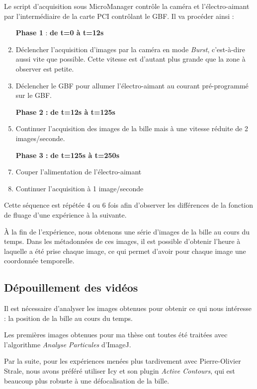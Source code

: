 	Le script d'acquisition sous MicroManager contrôle la caméra et l'électro-aimant par l'intermédiaire de la carte PCI contrôlant le GBF. Il va procéder ainsi : 
	
	\begin{enumerate}
	\item[\textbf{Phase 1} : ]\textbf{de t=0 à t=12s}
	\item Déclencher l'acquisition d'images par la caméra en mode \emph{Burst}, c'est-à-dire aussi vite que possible. Cette vitesse est d'autant plus grande que la zone à observer est petite. 
	\item Déclencher le GBF pour allumer l'électro-aimant au courant pré-programmé sur le GBF. 
	\item[\textbf{Phase 2 :} ] \textbf{de t=12s à t=125s}
	\item Continuer l'acquisition des images de la bille mais à une vitesse réduite de 2 images/seconde.
	\item[\textbf{Phase 3 : }] \textbf{de t=125s à t=250s}
	\item Couper l'alimentation de l'électro-aimant
	\item Continuer l'acquisition à 1 image/seconde
	
	\end{enumerate}
	
	Cette séquence est répétée 4 ou 6 fois afin d'observer les différences de la fonction de fluage d'une expérience à la suivante. 
	
	 \`A la fin de l'expérience, nous obtenons une série d'images de la bille au cours du temps. 
	 Dans les métadonnées de ces images, il est possible d'obtenir l'heure à laquelle a été prise chaque image, ce qui permet d'avoir pour chaque image une coordonnée temporelle. 
	
	\subsection{Dépouillement des vidéos}
	
	Il est nécessaire d'analyser les images obtenues pour obtenir ce qui nous intéresse : la position de la bille au cours du temps. 
	
	Les premières images obtenues pour ma thèse ont toutes été traitées avec l'algorithme \emph{Analyse Particules} d'ImageJ. 

Par la suite, pour les expériences menées plus tardivement avec Pierre-Olivier Strale, nous avons préféré utiliser Icy et son plugin \emph{Active Contours}, qui est beaucoup plus robuste à une défocalisation de la bille. 

